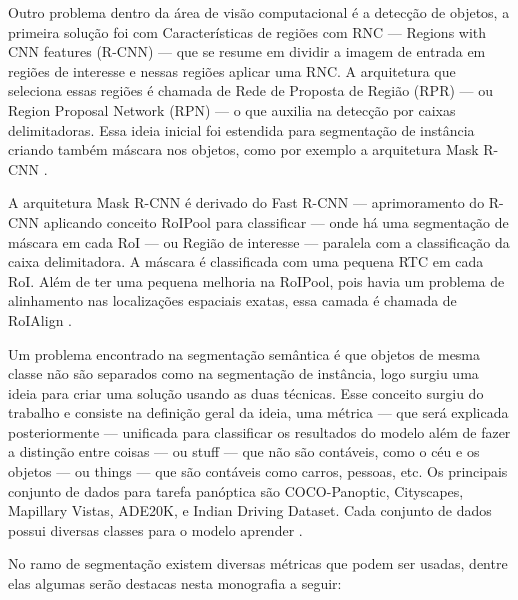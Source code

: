 
Outro problema dentro da área de visão computacional é a detecção de objetos, a primeira solução foi com Características de regiões com RNC — Regions with CNN features (R-CNN) — que se resume em dividir a imagem de entrada em regiões de interesse e nessas regiões aplicar uma RNC. A arquitetura que seleciona essas regiões é chamada de Rede de Proposta de Região (RPR) — ou Region Proposal Network (RPN) — o que auxilia na detecção por caixas delimitadoras. Essa ideia inicial foi estendida para segmentação de instância criando também máscara nos objetos, como por exemplo a arquitetura Mask R-CNN \space\cite{dp_semantic_segmantation, lapix}.

A arquitetura Mask R-CNN é derivado do Fast R-CNN — aprimoramento do R-CNN aplicando conceito RoIPool para classificar — onde há uma segmentação de máscara em cada RoI — ou Região de interesse — paralela com a classificação da caixa delimitadora. A máscara é classificada com uma pequena RTC em cada RoI. Além de ter uma pequena melhoria na RoIPool, pois havia um problema de alinhamento nas localizações espaciais exatas, essa camada é chamada de RoIAlign \space\cite{maskRCNN}.


Um problema encontrado na segmentação semântica é que objetos de mesma classe não são separados como na segmentação de instância, logo surgiu uma ideia para criar uma solução usando as duas técnicas. Esse conceito surgiu do trabalho  e consiste na definição geral da ideia, uma métrica — que será explicada posteriormente — unificada para classificar os resultados do modelo além de fazer a distinção entre coisas — ou stuff — que não são contáveis, como o céu e os objetos — ou things — que são contáveis como carros, pessoas, etc.
Os principais conjunto de dados para tarefa panóptica são COCO-Panoptic, Cityscapes, Mapillary Vistas, ADE20K, e Indian Driving Dataset. Cada conjunto de dados possui diversas classes para o modelo aprender \space\cite{v7labs2022panoptic}.

\label{sec:metricas_tecnicas}

No ramo de segmentação existem diversas métricas que podem ser usadas, dentre elas algumas serão destacas nesta monografia a seguir:

\label{sec:classificacao_conjuntos}

